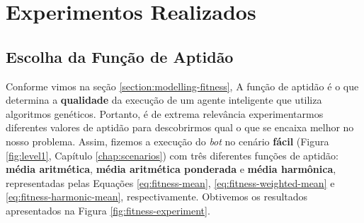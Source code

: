 \section{\label{section:experiments}Experimentos Realizados}

\subsection{\label{section:fitness-experiment}Escolha da Função de Aptidão}
Conforme vimos na seção \ref{section:modelling-fitness}, A função de aptidão é o
que determina a \textbf{qualidade} da execução de um agente inteligente que
utiliza algoritmos genéticos. Portanto, é de extrema relevância experimentarmos
diferentes valores de aptidão para descobrirmos qual o que se encaixa melhor no
nosso problema. Assim, fizemos a execução do \textit{bot} no cenário
\textbf{fácil} (Figura \ref{fig:level1}, Capítulo \ref{chap:scenarios}) com três
diferentes funções de aptidão: \textbf{média aritmética}, \textbf{média
aritmética ponderada} e \textbf{média harmônica}, representadas pelas Equações
\ref{eq:fitness-mean}, \ref{eq:fitness-weighted-mean} e
\ref{eq:fitness-harmonic-mean}, respectivamente. Obtivemos os resultados
apresentados na Figura \ref{fig:fitness-experiment}.

